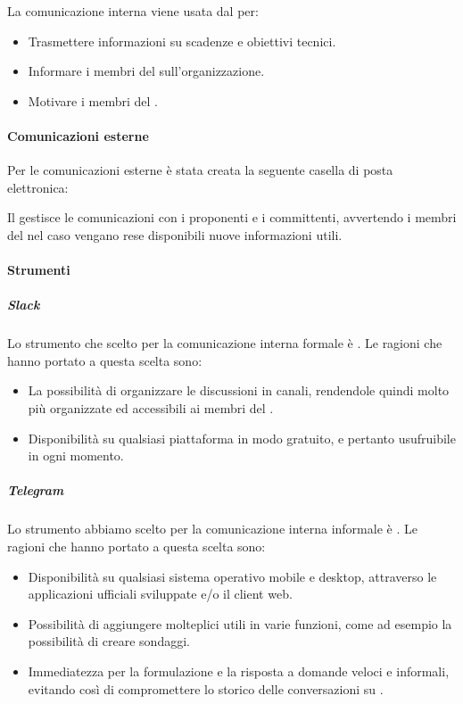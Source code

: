 La comunicazione interna viene usata dal  per:
\begin{itemize}
\item
Trasmettere informazioni su scadenze e obiettivi tecnici.
\item
Informare i membri del  sull'organizzazione.
\item
Motivare i membri del .
\end{itemize}

\paragraph{Comunicazioni esterne}
Per le comunicazioni esterne è stata creata la seguente casella di posta elettronica:

\begin{center} \email \end{center}

Il \Pm gestisce le comunicazioni con i proponenti e i committenti, avvertendo i membri del  nel caso vengano rese disponibili nuove informazioni utili.

\paragraph{Strumenti}

\subparagraph{Slack}
Lo strumento che scelto per la comunicazione interna formale è .
Le ragioni che hanno portato a questa scelta sono:
\begin{itemize}
\item La possibilità di organizzare le discussioni in canali, rendendole quindi molto più organizzate ed accessibili ai membri del .
\item Disponibilità su qualsiasi piattaforma in modo gratuito, e pertanto usufruibile in ogni momento.
\end{itemize}

\subparagraph{Telegram}
Lo strumento abbiamo scelto per la comunicazione interna informale è .
Le ragioni che hanno portato a questa scelta sono:
\begin{itemize}
\item Disponibilità su qualsiasi sistema operativo mobile e desktop, attraverso le applicazioni ufficiali sviluppate e/o il client web.
\item Possibilità di aggiungere molteplici  utili in varie funzioni, come ad esempio la possibilità di creare sondaggi.
\item Immediatezza per la formulazione e la risposta a domande veloci e informali, evitando così di compromettere lo storico delle conversazioni su .
\end{itemize}

